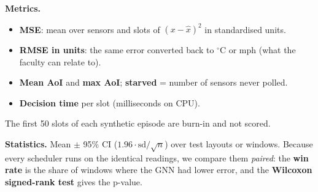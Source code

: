 \textbf{Metrics.}
\begin{itemize}
  \item \textbf{MSE}: mean over sensors and slots of $(x-\hat x)^2$ in standardised units.
  \item \textbf{RMSE in units}: the same error converted back to $^\circ$C or mph (what the faculty can relate to).
  \item \textbf{Mean AoI} and \textbf{max AoI}; \textbf{starved} = number of sensors never polled.
  \item \textbf{Decision time} per slot (milliseconds on CPU).
\end{itemize}
The first 50 slots of each synthetic episode are burn-in and not scored.

\textbf{Statistics.} Mean $\pm$ 95\% CI ($1.96\cdot\text{sd}/\sqrt n$) over test layouts or windows. Because every
scheduler runs on the identical readings, we compare them \emph{paired}: the \textbf{win rate} is the share of
windows where the GNN had lower error, and the \textbf{Wilcoxon signed-rank test} gives the p-value.

